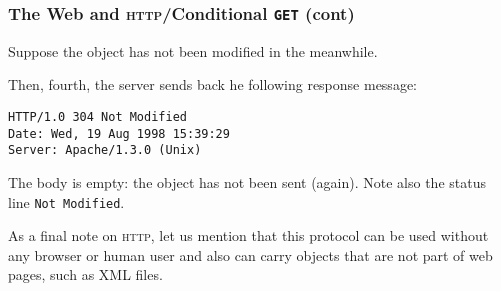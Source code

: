 %
\begin{frame}[containsverbatim]
\frametitle{The Web and \textsc{http}/Conditional \texttt{GET} (cont)}

Suppose the object has not been modified in the meanwhile.

\bigskip

Then, fourth, the server sends back he following response message:
{\small
\begin{verbatim}
HTTP/1.0 304 Not Modified
Date: Wed, 19 Aug 1998 15:39:29
Server: Apache/1.3.0 (Unix)
\end{verbatim}
}
The body is empty: the object has not been sent (again). Note also the
status line \verb+Not Modified+.

\bigskip

As a final note on \textsc{http}, let us mention that this protocol
can be used without any browser or human user and also can carry
objects that are not part of web pages, such as XML files.

\end{frame}

